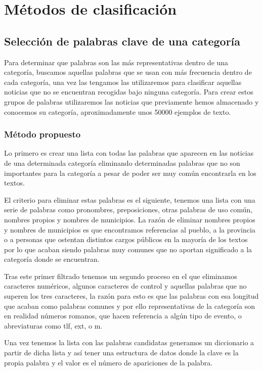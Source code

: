 \chapter{Métodos de clasificación}
\section{Selección de palabras clave de una categoría}
\label{sec:atributos}


Para determinar que palabras son las más representativas dentro de una categoría, buscamos aquellas palabras que se usan con más frecuencia dentro de cada categoría, una vez las tengamos las utilizaremos para clasificar aquellas noticias que no se encuentran recogidas bajo ninguna categoría. Para crear estos grupos de palabras utilizaremos las noticias que previamente hemos almacenado y conocemos su categoría, aproximadamente unos 50000 ejemplos de texto.

\subsection{Método propuesto}

Lo primero es crear una lista con todas las palabras que aparecen en las noticias de una determinada categoría eliminando determinadas palabras que no son importantes para la categoría a pesar de poder ser muy común encontrarla en los textos. 

El criterio para eliminar estas palabras es el siguiente, tenemos una lista con una serie de palabras como pronombres, preposiciones, otras palabras de uso común, nombres propios y nombres de municipios. La razón de eliminar nombres propios y nombres de municipios es que encontramos referencias al pueblo, a la provincia o a personas que ostentan distintos cargos públicos en la mayoría de los textos por lo que acaban siendo palabras muy comunes que no aportan significado a la categoría donde se encuentran.

Tras este primer filtrado tenemos un segundo proceso en el que eliminamos caracteres numéricos, algunos caracteres de control y aquellas palabras que no superen los tres caracteres, la razón para esto es que las palabras con esa longitud que acaban como palabras comunes y por ello representativas de la categoría son en realidad números romanos, que hacen referencia a algún tipo de evento, o abreviaturas como tlf, ext, o m.

Una vez tenemos la lista con las palabras candidatas generamos un diccionario a partir de dicha lista y así tener una estructura de datos donde la clave es la propia palabra y el valor es el número de apariciones de la palabra.

